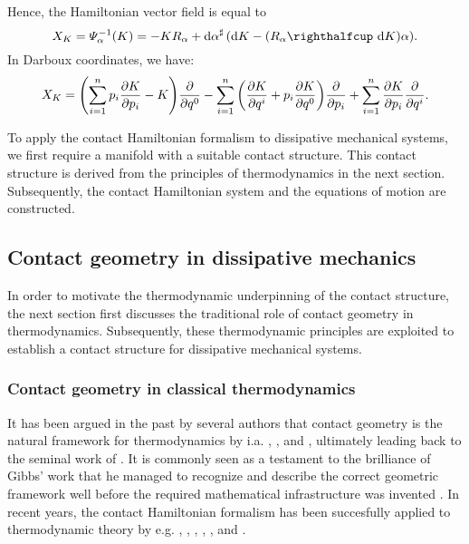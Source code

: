 Hence, the Hamiltonian vector field is equal to
\begin{equation}
    X_K = \Psi^{-1}_\alpha(K) = -K R_\alpha + \fromDual{\dd{\alpha}}\qty(\dd{K} - (\intpr{R_\alpha}{\dd{K}})\alpha).
    \label{eq:contact_hamiltonian_vf}
\end{equation}
In Darboux coordinates, we have:
\begin{equation}
    X_K = \qty(\sum_{i=1}^n p_i\pdv{K}{p_i} - K) \pdv{}{q^0}- \sum_{i = 1}^n \qty(\pdv{K}{q^i} + p_i \pdv{K}{q^0})\pdv{}{p_i} + \sum_{i=1}^n \pdv{K}{p_i}\pdv{}{q^i}.
\end{equation}

To apply the contact Hamiltonian formalism to dissipative mechanical systems, we first require a manifold with a suitable contact structure. This contact structure is derived from the principles of thermodynamics in the next section. Subsequently, the contact Hamiltonian system and the equations of motion are constructed.


\subsection{Contact geometry in dissipative mechanics}
\label{ssec:contact_dissipation}
In order to motivate the thermodynamic underpinning of the contact structure, the next section first discusses the traditional role of contact geometry in thermodynamics. Subsequently, these thermodynamic principles are exploited to establish a contact structure for dissipative mechanical systems.

\subsubsection{Contact geometry in classical thermodynamics}
It has been argued in the past by several authors that contact geometry is the natural framework for thermodynamics by i.a. \citet{Arnold1991,Arnold1989a,Arnold1989,Arnold1989b}, \citet{Bamberg1988}, \citet{Burke1985} and \citet{Hermann1973}, ultimately leading back to the seminal work of \citet{Gibbs1873}. It is commonly seen as a testament to the brilliance of Gibbs' work that he managed to recognize and describe the correct geometric framework well before the required mathematical infrastructure was invented \cite{Wightman1979}. In recent years, the contact Hamiltonian formalism has been succesfully applied to thermodynamic theory by e.g. \citet{Mrugala1991,Mrugala2000,Mrugala1984,Mrugala1985,Mrugala1993,Mrugala1996}, \citet{Balian2001}, \citet{VanderSchaft2021a,VanderSchaft2018}, \citet{Maschke2018}, \citet{Bravetti2015}, and \citet{Simoes2020}. 

